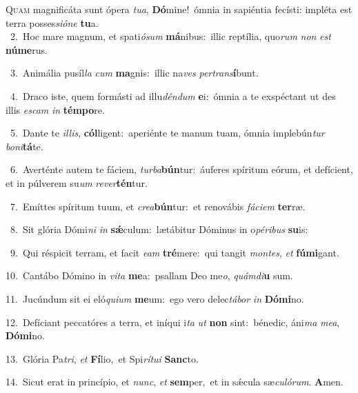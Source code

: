 \lettrine{\initial\textcolor{\initialcolor}{Q}}{uam} magnificáta sunt ópera \textit{tu}\-\textit{a}, \textbf{Dó}\-mine!~\star ómnia in sapiéntia fecísti: impléta est terra posses\-\textit{si}\-\textit{ó}\textit{ne} \textbf{tu}\-a.\\
{\numbfont\textcolor{\numbcolor}{~2.}}~Hoc mare magnum, et spati\-\textit{ó}\-\textit{sum} \textbf{má}\-nibus:~\star illic reptília, quo\textit{rum} \textit{non} \textit{est} \textbf{nú}\-\textbf{me}rus.\par
{\numbfont\textcolor{\numbcolor}{~3.}}~Animália pusíl\textit{la} \textit{cum} \textbf{ma}\-gnis:~\star illic na\textit{ves} \textit{per}\-\textit{trans}\textbf{í}bunt.\par
{\numbfont\textcolor{\numbcolor}{~4.}}~Draco iste, quem formásti ad illu\-\textit{dén}\-\textit{dum} \textbf{e}\-i:~\star ómnia a te exspéctant ut des illis \textit{es}\-\textit{cam} \textit{in} \textbf{tém}\-\textbf{po}re.\par
{\numbfont\textcolor{\numbcolor}{~5.}}~Dante te \textit{il}\-\textit{lis}, \textbf{cól}\-ligent:~\star aperiénte te manum tuam, ómnia implebún\textit{tur} \textit{bo}\-\textit{ni}\textbf{tá}te.\par
{\numbfont\textcolor{\numbcolor}{~6.}}~Averténte autem te fáciem, \textit{tur}\-\textit{ba}\textbf{bún}tur:~\star áuferes spíritum eórum, et defícient, et in púlverem su\textit{um} \textit{re}\-\textit{ver}\textbf{tén}tur.\par
{\numbfont\textcolor{\numbcolor}{~7.}}~Emíttes spíritum tuum, et \textit{cre}\-\textit{a}\textbf{bún}tur:~\star et renovábis \textit{fá}\-\textit{ci}\textit{em} \textbf{ter}\-ræ.\par
{\numbfont\textcolor{\numbcolor}{~8.}}~Sit glória Dómi\textit{ni} \textit{in} \textbf{sǽ}\-culum:~\star lætábitur Dóminus in o\-\textit{pé}\-\textit{ri}\textit{bus} \textbf{su}\-is:\par
{\numbfont\textcolor{\numbcolor}{~9.}}~Qui réspicit terram, et facit \textit{e}\-\textit{am} \textbf{tré}\-mere:~\star qui tangit \textit{mon}\-\textit{tes}, \textit{et} \textbf{fú}\-\textbf{mi}gant.\par
{\numbfont\textcolor{\numbcolor}{10.}}~Cantábo Dómino in \textit{vi}\-\textit{ta} \textbf{me}\-a:~\star psallam Deo me\-\textit{o}\-, \textit{quám}\-\textit{di}\textbf{u} sum.\par
{\numbfont\textcolor{\numbcolor}{11.}}~Jucúndum sit ei eló\-\textit{qui}\-\textit{um} \textbf{me}\-um:~\star ego vero delec\-\textit{tá}\-\textit{bor} \textit{in} \textbf{Dó}\-\textbf{mi}no.\par
{\numbfont\textcolor{\numbcolor}{12.}}~Defíciant peccatóres a terra, et iníqui i\textit{ta} \textit{ut} \textbf{non} sint:~\star bénedic, áni\textit{ma} \textit{me}\-\textit{a}, \textbf{Dó}\-\textbf{mi}no.\par
{\numbfont\textcolor{\numbcolor}{13.}}~Glória Pa\-\textit{tri}\-, \textit{et} \textbf{Fí}\-lio,~\star et Spi\-\textit{rí}\-\textit{tu}\textit{i} \textbf{Sanc}\-to.\par
{\numbfont\textcolor{\numbcolor}{14.}}~Sicut erat in princípio, et \textit{nunc}\-, \textit{et} \textbf{sem}\-per,~\star et in sǽcula sæ\-\textit{cu}\-\textit{ló}\textit{rum}. \textbf{A}\-men.\par
